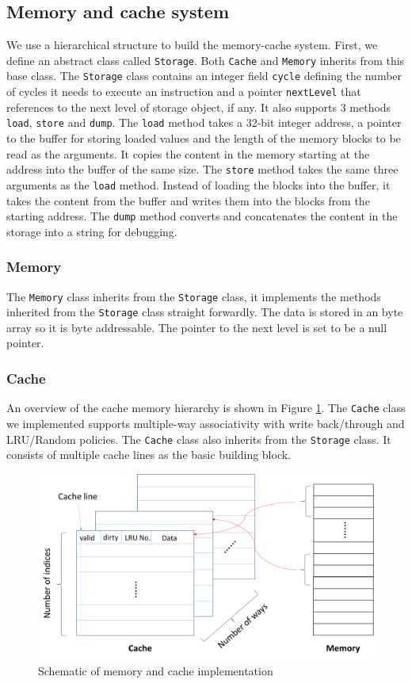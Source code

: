 \documentclass{sig-alternate}
\begin{document}
\subsection{Memory and cache system}
We use a hierarchical structure to build the memory-cache system. First, we define an abstract class called \texttt{Storage}. Both \texttt{Cache} and \texttt{Memory} inherits from this base class. The \texttt{Storage} class contains an integer field \texttt{cycle} defining the number of cycles it needs to execute an instruction and a pointer \texttt{nextLevel} that references to the next level of storage object, if any. It also supports 3 methods \texttt{load}, \texttt{store} and \texttt{dump}. The \texttt{load} method takes a 32-bit integer address, a pointer to the buffer for storing loaded values and the length of the memory blocks to be read as the arguments. It copies the content in the memory starting at the address into the buffer of the same size. The \texttt{store} method takes the same three arguments as the \texttt{load} method. Instead of loading the blocks into the buffer, it takes the content from the buffer and writes them into the blocks from the starting address. The \texttt{dump} method converts and concatenates the content in the storage into a string for debugging.  

\subsubsection{Memory}
The \texttt{Memory} class inherits from the \texttt{Storage} class, it implements the methods inherited from the \texttt{Storage} class straight forwardly. The data is stored in an byte array so it is byte addressable. The pointer to the next level is set to be a null pointer. 

\subsubsection{Cache}
An overview of the cache memory hierarchy is shown in Figure \ref{fig:cache_vs_memory}. The \texttt{Cache} class we implemented supports multiple-way associativity with write back/through and LRU/Random policies. The \texttt{Cache} class also inherits from the \texttt{Storage} class. It consists of multiple cache lines as the basic building block.

\begin{figure}[!ht]
\centering
\includegraphics[width = 0.7\linewidth,keepaspectratio]{Cache_and_Memory.png}
\caption{Schematic of memory and cache implementation}
\label{fig:cache_vs_memory}
\end{figure}
\end{document}
